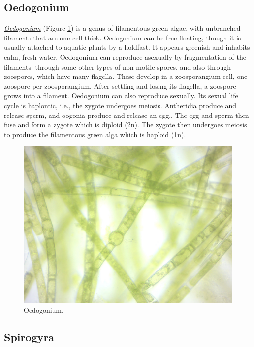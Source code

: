 \subsection{Oedogonium}\label{oedogonium}

\href{https://en.wikipedia.org/wiki/Oedogonium}{\emph{Oedogonium}}
(Figure \ref{fig:oedogonium}) is a genus of filamentous green algae,
with unbranched filaments that are one cell thick. Oedogonium can be
free-floating, though it is usually attached to aquatic plants by a
holdfast. It appears greenish and inhabits calm, fresh water. Oedogonium
can reproduce asexually by fragmentation of the filaments, through some
other types of non-motile spores, and also through zoospores, which have
many flagella. These develop in a zoosporangium cell, one zoospore per
zoosporangium. After settling and losing its flagella, a zoospore grows
into a filament. Oedogonium can also reproduce sexually. Its sexual life
cycle is haplontic, i.e., the zygote undergoes meiosis. Antheridia
produce and release sperm, and oogonia produce and release an egg,. The
egg and sperm then fuse and form a zygote which is diploid (2n). The
zygote then undergoes meiosis to produce the filamentous green alga
which is haploid (1n).

\begin{figure}

{\centering \includegraphics[width=0.7\linewidth]{./figures/protists/oedogonium} 

}

\caption{Oedogonium.}\label{fig:oedogonium}
\end{figure}

\subsection{Spirogyra}\label{spirogyra}


